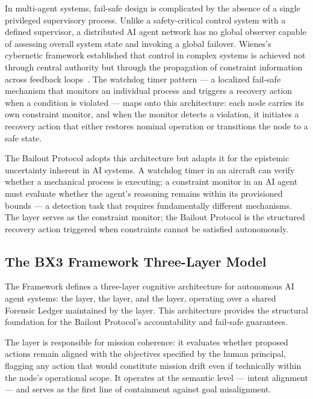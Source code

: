 In multi-agent systems, fail-safe design is complicated by the absence of a single privileged supervisory process. Unlike a safety-critical control system with a defined supervisor, a distributed AI agent network has no global observer capable of assessing overall system state and invoking a global failover. Wienes's cybernetic framework established that control in complex systems is achieved not through central authority but through the propagation of constraint information across feedback loops~\cite{wiener1948}. The watchdog timer pattern — a localized fail-safe mechanism that monitors an individual process and triggers a recovery action when a condition is violated — maps onto this architecture: each node carries its own constraint monitor, and when the monitor detects a violation, it initiates a recovery action that either restores nominal operation or transitions the node to a safe state.

The Bailout Protocol adopts this architecture but adapts it for the epistemic uncertainty inherent in AI systems. A watchdog timer in an aircraft can verify whether a mechanical process is executing; a constraint monitor in an AI agent must evaluate whether the agent's reasoning remains within its provisioned bounds — a detection task that requires fundamentally different mechanisms. The \bxthree{} \bounds{} layer serves as the constraint monitor; the Bailout Protocol is the structured recovery action triggered when constraints cannot be satisfied autonomously.

\subsection{The BX3 Framework Three-Layer Model}
\label{sec:bx3-model}

The \bxthree{} Framework defines a three-layer cognitive architecture for autonomous AI agent systems: the \purpose{} layer, the \truth{} layer, and the \bounds{} layer, operating over a shared Forensic Ledger maintained by the \fact{} layer. This architecture provides the structural foundation for the Bailout Protocol's accountability and fail-safe guarantees.

The \purpose{} layer is responsible for mission coherence: it evaluates whether proposed actions remain aligned with the objectives specified by the human principal, flagging any action that would constitute mission drift even if technically within the node's operational scope. It operates at the semantic level — intent alignment — and serves as the first line of containment against goal misalignment.

